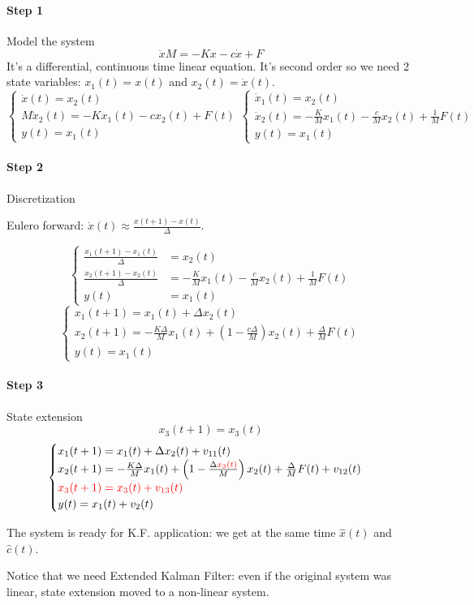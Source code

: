 \begin{exa}
    \paragraph{Step 1} Model the system
    \[
        \ddot{x}M = -Kx - c\dot{x} + F
    \]
    It's a differential, continuous time linear equation.
    It's second order so we need 2 state variables: $x_1(t) = x(t)$ and $x_2(t) = \dot{x}(t)$.
    \[
        \begin{cases}
            \dot{x}(t) = x_2(t) \\
            M\dot{x}_2(t) = -Kx_1(t) -cx_2(t) + F(t) \\
            y(t) = x_1(t)
        \end{cases}
        \begin{cases}
            \dot{x}_1(t) = x_2(t) \\
            \dot{x}_2(t) = -\frac{K}{M} x_1(t) - \frac{c}{M} x_2(t) + \frac{1}{M}F(t) \\
            y(t) = x_1(t)
        \end{cases}
    \]

    \paragraph{Step 2} Discretization

    Eulero forward: $\dot{x}(t) \approx \frac{x(t+1)-x(t)}{\Delta}$.

    \[
        \begin{cases}
            \frac{x_1(t+1)-x_1(t)}{\Delta} &= x_2(t) \\
            \frac{x_2(t+1)-x_2(t)}{\Delta} &= -\frac{K}{M} x_1(t) - \frac{c}{M} x_2(t) + \frac{1}{M}F(t) \\
            y(t) &= x_1(t)
        \end{cases}
    \]
    \[
        \begin{cases}
            x_1(t+1) = x_1(t) + \Delta x_2(t) \\
            x_2(t+1) = -\frac{K\Delta}{M}x_1(t) + \left(1-\frac{c\Delta}{M}\right)x_2(t) + \frac{\Delta}{M}F(t) \\
            y(t) = x_1(t)
        \end{cases}
    \]

    \paragraph{Step 3} State extension
    \[
        x_3(t+1) = x_3(t)
    \]
    \[
        \begin{cases}
            x_1(t+1) = x_1(t) + \Delta x_2(t) + v_{11}(t) \\
            x_2(t+1) = -\frac{K\Delta}{M}x_1(t) + \left(1-\frac{\Delta {\color{red}x_3(t)}}{M}\right)x_2(t) + \frac{\Delta}{M}F(t) + v_{12}(t) \\
            {\color{red}x_3(t+1) = x_3(t) + v_{13}(t)} \\
            y(t) = x_1(t) + v_2(t)
        \end{cases}
    \]

    The system is ready for K.F. application: we get at the same time $\hat{x}(t)$ and $\hat{c}(t)$.

    Notice that we need Extended Kalman Filter: even if the original system was linear, state extension moved to a non-linear system.
\end{exa}
